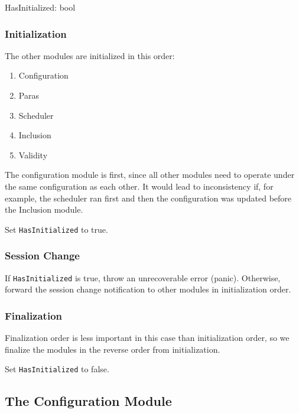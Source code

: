 \begin{verbnobox}[\small] HasInitialized: bool
\end{verbnobox}

\subsubsection{Initialization}

The other modules are initialized in this order:

\begin{enumerate}
    \item Configuration
    \item Paras
    \item Scheduler
    \item Inclusion
    \item Validity
\end{enumerate}

The configuration module is first, since all other modules need to operate under
the same configuration as each other. It would lead to inconsistency if, for
example, the scheduler ran first and then the configuration was updated before
the Inclusion module.
\newline

Set \verb|HasInitialized| to true.

\subsubsection{Session Change}

If \verb|HasInitialized| is true, throw an unrecoverable error (panic).
Otherwise, forward the session change notification to other modules in
initialization order.

\subsubsection{Finalization}

Finalization order is less important in this case than initialization order, so
we finalize the modules in the reverse order from initialization.
\newline

Set \verb|HasInitialized| to false.

\subsection{The Configuration Module}


